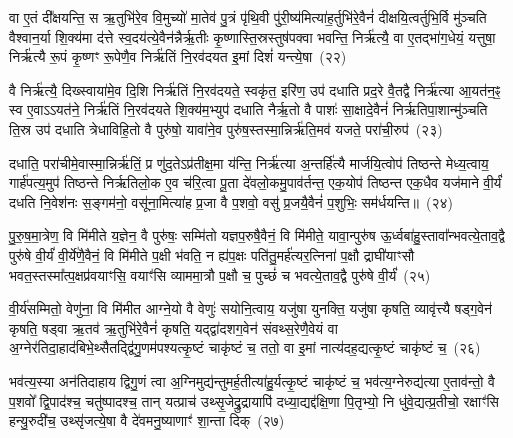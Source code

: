 वा ए॒तं दी᳚क्षयन्ति॒ स ऋ॒तुभि॑रे॒व वि॒मुच्यो॑ मा॒तेव॑ पु॒त्रं पृ॑थि॒वी पु॑री॒ष्य॑मित्या॑ह॒र्तुभि॑रे॒वैनं॑ दीक्षयि॒त्वर्तुभि॒र्वि मु॑ञ्चति वैश्वान॒र्या शि॒क्य॑मा द॑त्ते स्व॒दय॑त्ये॒वैन॑न्नैर्\mbox{}ऋ॒तीः कृ॒ष्णास्ति॒स्रस्तुष॑\-पक्वा भवन्ति॒ निर्\mbox{}ऋ॑त्यै॒ वा ए॒तद्भा॑ग॒धेयं॒ यत्तुषा॒ निर्\mbox{}ऋ॑त्यै रू॒पं कृ॒ष्णꣳ रू॒पेणै॒व निर्\mbox{}ऋ॑तिं नि॒रव॑दयत इ॒मां दिशं॑ यन्त्ये॒षा~(२२)\ip

वै निर्\mbox{}ऋ॑त्यै॒ दिख्स्वाया॑मे॒व दि॒शि निर्\mbox{}ऋ॑तिं नि॒रव॑दयते॒ स्वकृ॑त॒ इरि॑ण॒ उप॑ दधाति प्रद॒रे वै॒तद्वै निर्\mbox{}ऋ॑त्या आ॒यत॑न॒ꣴ॒ स्व ए॒वा\-ऽऽ\-यत॑ने॒ निर्\mbox{}ऋ॑तिं नि॒रव॑दयते शि॒क्य॑म॒भ्युप॑ दधाति नैर्\mbox{}ऋ॒तो वै पाशः॑ सा॒क्षादे॒वैनं॑ निर्\mbox{}ऋतिपा॒शान्मु॑ञ्चति ति॒स्र उप॑ दधाति त्रेधाविहि॒तो वै पुरु॑षो॒ यावा॑ने॒व पुरु॑ष॒स्तस्मा॒न्निर्\mbox{}ऋ॑ति॒मव॑ यजते॒ परा॑ची॒रुप॑~(२३)\ip

दधाति॒ परा॑चीमे॒वास्मा॒न्निर्\mbox{}ऋ॑तिं॒ प्र णु॑द॒ते\-ऽप्र॑तीक्ष॒मा य॑न्ति॒ निर्\mbox{}ऋ॑त्या अ॒न्तर्\mbox{}हि॑त्यै मार्जयि॒त्वोप॑ तिष्ठन्ते मेध्य॒त्वाय॒ गार्\mbox{}ह॑पत्य॒मुप॑ तिष्ठन्ते निर्\mbox{}ऋतिलो॒क ए॒व च॑रि॒त्वा पू॒ता दे॑वलो॒कमु॒पाव॑र्तन्त॒ एक॒योप॑ तिष्ठन्त एक॒धैव यज॑माने वी॒र्यं॑ दधति नि॒वेश॑नः स॒ङ्गम॑नो॒ वसू॑ना॒मित्या॑ह प्र॒जा वै प॒शवो॒ वसु॑ प्र॒जयै॒वैनं॑ प॒शुभिः॒ सम॑र्धयन्ति॥~(२४)\ip

{\anuvakamend[{ऋ॒तुभि॑रे॒षा परा॑ची॒रुपा॒ष्टाच॑त्वारिꣳशच्च}]}

पु॒रु॒ष॒मा॒त्रेण॒ वि मि॑मीते य॒ज्ञेन॒ वै पुरु॑षः॒ सम्मि॑तो यज्ञप॒रुषै॒वैनं॒ वि मि॑मीते॒ यावा॒न्पुरु॑ष ऊ॒र्ध्वबा॑हु॒स्तावा᳚न्भव\-त्ये॒ताव॒द्वै पुरु॑षे वी॒र्यं॑ वी॒र्ये॑णै॒वैनं॒ वि मि॑मीते प॒क्षी भ॑वति॒ न ह्य॑प॒क्षः पति॑तु॒मर्\mbox{}ह॑त्यर॒त्निना॑ प॒क्षौ द्राघी॑याꣳसौ भवत॒स्तस्मा᳚त्प॒क्षप्र॑वयाꣳसि॒ वयाꣳ॑सि व्याममा॒त्रौ प॒क्षौ च॒ पुच्छं॑ च भवत्ये॒ताव॒द्वै पुरु॑षे वी॒र्यं॑~(२५)\ip

वी॒र्य॑सम्मितो॒ वेणु॑ना॒ वि मि॑मीत आग्ने॒यो वै वेणुः॑ सयोनि॒त्वाय॒ यजु॑षा युनक्ति॒ यजु॑षा कृषति॒ व्यावृ॑त्त्यै षड्ग॒वेन॑ कृषति॒ षड्वा ऋ॒तव॑ ऋ॒तुभि॑रे॒वैनं॑ कृषति॒ यद्द्वा॑दशग॒वेन॑ संवथ्स॒रेणै॒वेयं वा अ॒ग्नेर॑तिदा॒हाद॑बिभे॒थ्सैतद्द्वि॑गु॒णम॑पश्यत्कृ॒ष्टं चाकृ॑ष्टं च॒ ततो॒ वा इ॒मां नात्य॑दह॒द्यत्कृ॒ष्टं चाकृ॑ष्टं च॒~(२६)\ip

भव॑त्य॒स्या अन॑तिदाहाय द्विगु॒णं त्वा अ॒ग्निमुद्य॑न्तुमर्\mbox{}ह॒तीत्या॑हु॒र्यत्कृ॒ष्टं चाकृ॑ष्टं च॒ भव॑त्य॒ग्नेरुद्य॑त्या ए॒ताव॑न्तो॒ वै प॒शवो᳚ द्वि॒पाद॑श्च॒ चतु॑ष्पादश्च॒ तान् यत्प्राच॑ उथ्सृ॒जेद्रु॒द्रायापि॑ दध्या॒द्यद्द॑क्षि॒णा पि॒तृभ्यो॒ नि धु॑वे॒द्यत्प्र॒तीचो॒ रक्षाꣳ॑सि हन्यु॒रुदी॑च॒ उथ्सृ॑जत्ये॒षा वै दे॑वमनु॒ष्याणाꣳ॑ शा॒न्ता दिक्~(२७)\ip

